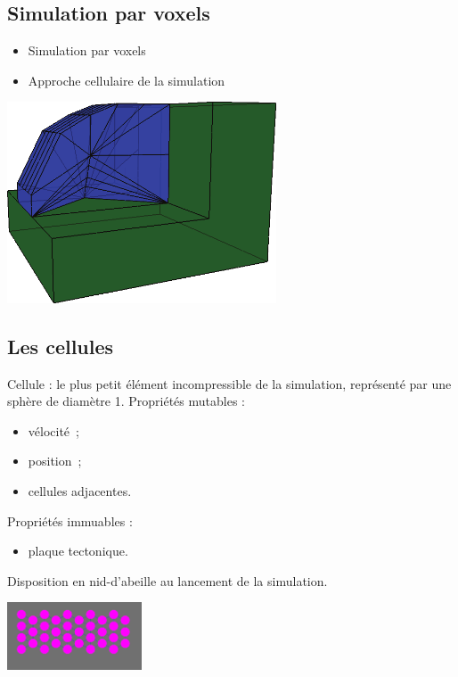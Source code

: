 \documentclass{beamer}
\begin{document}
\subsection{Simulation par voxels}
\begin{frame}
  \begin{center}
    \begin{itemize}
      \item Simulation par voxels
      \item Approche cellulaire de la simulation
    \end{itemize}
    \includegraphics[width=8cm]{kk.png}
  \end{center}
\end{frame}

\subsection{Les cellules}
\begin{frame}
  Cellule : le plus petit élément incompressible de la simulation, représenté par une sphère de diamètre 1. \smallbreak
  Propriétés mutables :
  \begin{itemize}
   \item vélocité~;
   \item position~;
   \item cellules adjacentes.
  \end{itemize}
  Propriétés immuables :
  \begin{itemize}
   \item plaque tectonique.
  \end{itemize}
  Disposition en nid-d'abeille au lancement de la simulation.
  \begin{center}
    \includegraphics[width=4cm]{Images/hexagone.png}
  \end{center}
\end{frame}
\end{document}
